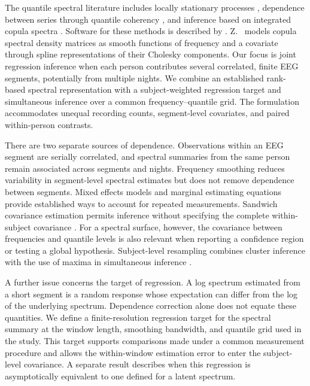 \documentclass[12pt,a4paper]{article}
\begin{document}
The quantile spectral literature includes locally stationary processes \citep{Birr2017}, dependence between series through quantile coherency \citep{Barunik2019}, and inference based on integrated copula spectra \citep{Goto2022}. Software for these methods is described by \citet{KleyJSS2016}. Z.~\citet{LiZ2023} models copula spectral density matrices as smooth functions of frequency and a covariate through spline representations of their Cholesky components. Our focus is joint regression inference when each person contributes several correlated, finite EEG segments, potentially from multiple nights. We combine an established rank-based spectral representation with a subject-weighted regression target and simultaneous inference over a common frequency--quantile grid. The formulation accommodates unequal recording counts, segment-level covariates, and paired within-person contrasts.

There are two separate sources of dependence. Observations within an EEG segment are serially correlated, and spectral summaries from the same person remain associated across segments and nights. Frequency smoothing reduces variability in segment-level spectral estimates but does not remove dependence between segments. Mixed effects models \citep{Laird1982} and marginal estimating equations \citep{Liang1986} provide established ways to account for repeated measurements. Sandwich covariance estimation permits inference without specifying the complete within-subject covariance \citep{White1980,Liang1986}. For a spectral surface, however, the covariance between frequencies and quantile levels is also relevant when reporting a confidence region or testing a global hypothesis. Subject-level resampling combines cluster inference \citep{Cameron2008} with the use of maxima in simultaneous inference \citep{Chernozhukov2013}.

A further issue concerns the target of regression. A log spectrum estimated from a short segment is a random response whose expectation can differ from the log of the underlying spectrum. Dependence correction alone does not equate these quantities. We define a finite-resolution regression target for the spectral summary at the window length, smoothing bandwidth, and quantile grid used in the study. This target supports comparisons made under a common measurement procedure and allows the within-window estimation error to enter the subject-level covariance. A separate result describes when this regression is asymptotically equivalent to one defined for a latent spectrum.
\end{document}
